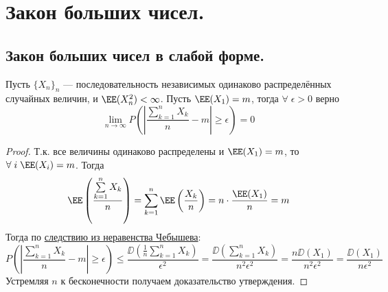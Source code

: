 \section{Закон больших чисел.}
\subsection{Закон больших чисел в слабой форме.}
\begin{lemma}
    Пусть $\{X_n\}_n$ --- последовательность независимых одинаково распределённых случайных величин, и $\EE(X_n^2) < \infty$.
    Пусть $\EE(X_1) = m$, тогда $\forall\;\epsilon > 0$ верно
    \[
        \lim\limits_{n \to \infty} P\left( \left| \frac{\sum\limits_{k = 1}^n X_k}{n} - m \right| \geq \epsilon \right) = 0
    \]
\end{lemma}
\begin{proof}
    Т.к. все величины одинаково распределены и $\EE(X_1) = m$, то $\forall\; i\; \EE(X_i) = m$. Тогда
    \[
        \EE\left( \frac{\sum\limits_{k = 1}^n X_k}{n} \right) = \sum\limits_{k = 1}^n \EE\left( \frac{X_k}{n} \right) =
        n \cdot \frac{\EE(X_1)}{n} = m
    \]
    Тогда по \hyperref[ChebyshevCorollary]{следствию из неравенства Чебышева}:
    \[
        P\left( \left| \frac{\sum\limits_{k = 1}^n X_k}{n} - m \right| \geq \epsilon \right)
        \leq \frac{\DD\left(\frac{1}{n}\sum\limits_{k = 1}^n X_k\right)}{\epsilon^2} =
        \frac{\DD\left(\sum\limits_{k = 1}^n X_k\right)}{n^2\epsilon^2} =
        \frac{n\DD(X_1)}{n^2\epsilon^2} = \frac{\DD(X_1)}{n\epsilon^2}
    \]
    Устремляя $n$ к бесконечности получаем доказательство утверждения.
\end{proof}
\begin{comment}
    Пусть $X_k$ --- независимые бернулиевские случайные величины с вероятностью успеха $p$. Тогда величина
    $\frac{\sum\limits_{k = 1}^n X_k}{n}$ --- частота успешного исхода эксперимента при проведении $n$ независимых
    испытаний. Известно, что $\EE(X_k) = p$, тогда $\DD(X_k) = \EE(X_k^2) - \EE(X_k)^2 = p^2 - p = pq$, где $q = (1 - p)$.
    Тогда
    \[
        P\left( \left| \frac{\sum\limits_{k = 1}^n X_k}{n} - p \right| \geq \epsilon \right)
        \leq \frac{pq}{n\epsilon^2} \xrightarrow[n \to \infty]{} 0
    \]
    Т.е. при проведении большого числа испытаний, частота успешного результата эсперимента стремится к $p$.

    Можно разобрать смысл этого утверждения на примере: пусть эксперимент у нас состоит в подкидывании монеты, успехом
    мы считаем выпадение орла. Очевидно, что в одном независимом испытании орёл выпадает с вероятностью $\frac{1}{2}$.
    При этом в жизни подбрасывая монету $5, 10$ и даже $100$ раз мы можем ни разу не получить орла. Но данное утверждение
    говорит нам о том, что при проведении огромного числа испытаний, вероятность выпадения орла в среднем во всех испытаниях
    будет примерно $\frac{1}{2}$.
\end{comment}
